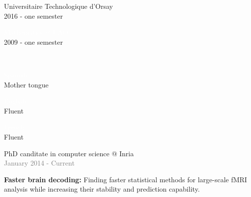 \documentclass[letterpaper]{article}
\begin{document}
\begin{minipage}{1.\linewidth}
{\begin{minipage}{0.47\linewidth}
\begin{minipage}{1\linewidth}
\begin{minipage}{0.9\linewidth}
{{			Universitaire Technologique d'Orsay}}\\					
			{\small\textcolor{gray!40}{2016 - one semester}}\\
		\end{minipage} 
		\begin{minipage}{0.9\linewidth}
			{\normalsize \textcolor{white}{Mathematics @ 
			UAO}}\\					
			{\small\textcolor{gray!40}{2009 - one semester}}\\
		\end{minipage} 
	\end{minipage} %
	\begin{minipage}{1\linewidth} %
		\centering{\huge\textmd{\textcolor{white}{Languages}}}\\
		\vspace{2ex}
		\begin{minipage}{0.3\linewidth}
			{\normalsize \textcolor{white}{Spanish}}\\
			{\small\textcolor{gray!40}{Mother tongue}}\\
		\end{minipage} 
		\hfill
		\begin{minipage}{0.3\linewidth}
			{\normalsize \textcolor{white}{English}}\\					
			{\small\textcolor{gray!40}{Fluent}}\\
		\end{minipage} 
		\hfill
		\begin{minipage}{0.3\linewidth}
			{\normalsize \textcolor{white}{French}}\\					
			{\small\textcolor{gray!40}{Fluent}}\\
		\end{minipage} 
	\end{minipage} %
\end{minipage} %
}%
% 
%
%
\hfill
\begin{minipage}{0.47\linewidth}
	\begin{minipage}{1\linewidth}
	\end{minipage}
	\begin{minipage}{1\linewidth} %
		\vspace{2ex}
		{\Large PhD canditate in computer science @ Inria}\\
		{\small\textcolor{gray}{January 2014 - Current}}
		
		{\textbf{Faster brain decoding:} Finding faster statistical methods 
		for large-scale fMRI analysis while increasing their stability and 
		prediction 
		capability.
	
}
\end{minipage}
\end{minipage}
\end{minipage}
\end{document}
